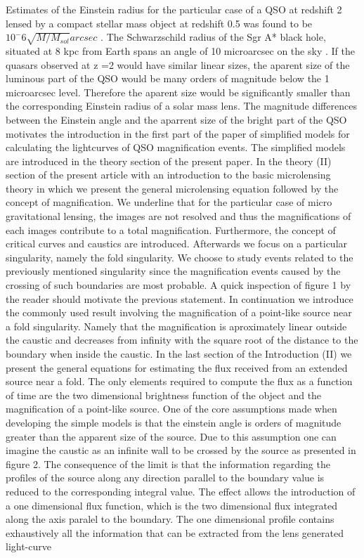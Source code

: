 Estimates of the Einstein radius for the particular case of a QSO at redshift 2 lensed by a compact stellar mass object at redshift 0.5 was found to be $10^-6 \sqrt{M/M_{sol}} arcsec$ \citep{2001PASA...18..207W}. The Schwarzschild radius of the Sgr A* black hole, situated at 8 kpc from Earth \citep{1993ARA&A..31..345R} spans an angle of 10 microarcsec on the sky \citep{2008JPhCS.131a2055D}. If the quasars observed at z =2 would have similar linear sizes, the aparent size of the  luminous part of the QSO would be many orders of magnitude below the 1 microarcsec level. Therefore the aparent size would be significantly smaller than the corresponding Einstein radius of a solar mass lens. 
The magnitude differences between the Einstein angle and the aparrent size of the bright part of the QSO motivates the introduction in the first part of the paper of simplified models for     
calculating the lightcurves of QSO magnification events. The simplified models are introduced in the theory section of the present paper. In the theory (II) section of the present article with an introduction to the basic microlensing theory in which we present the general microlensing equation followed by the concept of magnification. We underline that for the particular case of micro gravitational lensing,
the images are not resolved and thus the magnifications of each images contribute to a total magnification. Furthermore, the concept of critical curves and caustics are introduced. Afterwards we focus on a particular singularity, namely the fold singularity. We choose to study events related to the previously mentioned singularity since the magnification events caused by the crossing of such boundaries are most probable. A quick inspection of figure 1 by the reader should motivate the previous statement. 
In continuation we introduce the commonly used result involving the magnification of a point-like source near a fold singularity. Namely that the magnification is aproximately linear outside the caustic and decreases from infinity with the square root of the distance to the boundary when inside the caustic.  
In the last section of the Introduction (II) we present the general equations for estimating the flux received from an extended source near a fold. The only elements required to compute the flux as a function of time are the two dimensional brightness function of the object and the magnification of a point-like source. One of the core
assumptions made when developing the simple models is that the einstein angle is orders of magnitude greater than the apparent size of the source. Due to this assumption one can imagine the caustic as an infinite wall to be crossed by the source as presented in figure 2. The consequence of the limit is that the information regarding the profiles of the source along any direction parallel to the boundary value is reduced to the corresponding integral value. The effect allows the introduction of a one dimensional flux function, which is the two dimensional flux integrated along the axis paralel to the boundary. The one dimensional profile contains exhaustively all the information that can be extracted  from the lens generated light-curve \\

